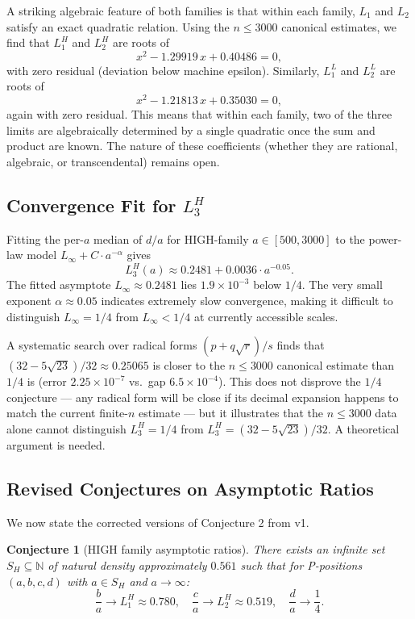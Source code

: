 \documentclass[12pt]{article}
\newtheorem{conjecture}{Conjecture}
\begin{document}
A striking algebraic feature of both families is that within each
family, $L_1$ and $L_2$ satisfy an exact quadratic relation. Using
the $n \leq 3000$ canonical estimates, we find that $L_1^H$ and
$L_2^H$ are roots of
\[
x^2 - 1.29919 \, x + 0.40486 = 0,
\]
with zero residual (deviation below machine epsilon). Similarly,
$L_1^L$ and $L_2^L$ are roots of
\[
x^2 - 1.21813 \, x + 0.35030 = 0,
\]
again with zero residual. This means that within each family, two
of the three limits are algebraically determined by a single quadratic
once the sum and product are known. The nature of these coefficients
(whether they are rational, algebraic, or transcendental) remains open.

\subsection{Convergence Fit for $L_3^H$}

Fitting the per-$a$ median of $d/a$ for HIGH-family $a \in [500,3000]$
to the power-law model $L_\infty + C \cdot a^{-\alpha}$ gives
\[
L_3^H(a) \approx 0.2481 + 0.0036 \cdot a^{-0.05}.
\]
The fitted asymptote $L_\infty \approx 0.2481$ lies $1.9 \times 10^{-3}$
below $1/4$. The very small exponent $\alpha \approx 0.05$ indicates
extremely slow convergence, making it difficult to distinguish
$L_\infty = 1/4$ from $L_\infty < 1/4$ at currently accessible scales.

A systematic search over radical forms $(p + q\sqrt{r})/s$ finds that
$(32 - 5\sqrt{23})/32 \approx 0.25065$ is closer to the $n \leq 3000$
canonical estimate than $1/4$ is (error $2.25 \times 10^{-7}$ vs.\ gap
$6.5 \times 10^{-4}$). This does not disprove the $1/4$ conjecture —
any radical form will be close if its decimal expansion happens to match
the current finite-$n$ estimate — but it illustrates that the $n \leq 3000$
data alone cannot distinguish $L_3^H = 1/4$ from $L_3^H = (32-5\sqrt{23})/32$.
A theoretical argument is needed.

\subsection{Revised Conjectures on Asymptotic Ratios}

We now state the corrected versions of Conjecture 2 from v1.

\begin{conjecture}[HIGH family asymptotic ratios]
\label{conj:high}
There exists an infinite set $S_H \subseteq \mathbb{N}$ of natural
density approximately $0.561$ such that for P-positions $(a,b,c,d)$
with $a \in S_H$ and $a \to \infty$:
\[
\frac{b}{a} \to L_1^H \approx 0.780, \quad
\frac{c}{a} \to L_2^H \approx 0.519, \quad
\frac{d}{a} \to \frac{1}{4}.
\]
\end{conjecture}
\end{document}
